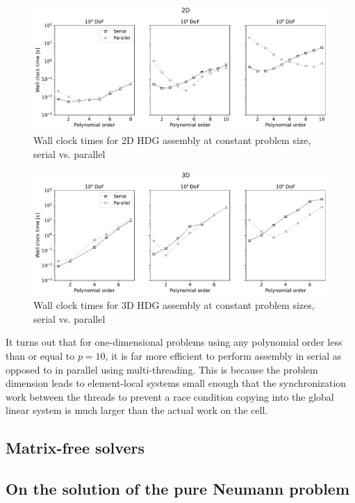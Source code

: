 \begin{figure}[htpb]
  \centering
  \includegraphics[width=0.8\linewidth]{img/assembly_benchmarking_2D.pdf}
  \caption{Wall clock times for 2D HDG assembly at constant problem size, serial vs. parallel}
  \label{fig:assembly_benchmarking_2D}
\end{figure}

\begin{figure}[htpb]
  \centering
  \includegraphics[width=0.8\linewidth]{img/assembly_benchmarking_3D.pdf}
  \caption{Wall clock times for 3D HDG assembly at constant problem sizes, serial vs. parallel}
  \label{fig:assembly_benchmarking_3D}
\end{figure}


It turns out that for one-dimensional problems using any polynomial order less than or equal to $p=10$, it is far more efficient to perform assembly in serial as opposed to in parallel using multi-threading.
This is because the problem dimension leads to element-local systems small enough that the synchronization work between the threads to prevent a race condition copying into the global linear system is much larger than the actual work on the cell.



\subsection{Matrix-free solvers}%
\label{sec:numerical_expeiments:matrix_free}


\subsection{On the solution of the pure Neumann problem}

